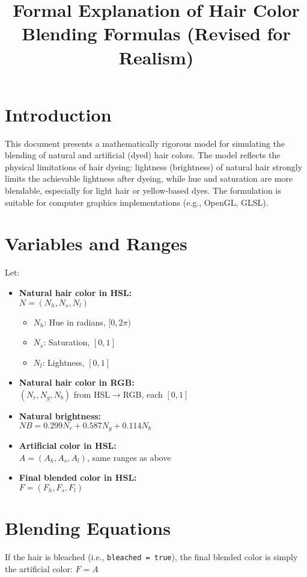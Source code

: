 \documentclass[12pt]{article}
\begin{document}
\title{Formal Explanation of Hair Color Blending Formulas (Revised for Realism)}
\author{}
\date{}
\maketitle

\section*{Introduction}
This document presents a mathematically rigorous model for simulating the blending of natural and artificial (dyed) hair colors. The model reflects the physical limitations of hair dyeing: lightness (brightness) of natural hair strongly limits the achievable lightness after dyeing, while hue and saturation are more blendable, especially for light hair or yellow-based dyes. The formulation is suitable for computer graphics implementations (e.g., OpenGL, GLSL).

\section*{Variables and Ranges}
Let:
\begin{itemize}
    \item \textbf{Natural hair color in HSL:} \\ $N = (N_h, N_s, N_l)$
    \begin{itemize}
        \item $N_h$: Hue in radians, $[0, 2\pi)$
        \item $N_s$: Saturation, $[0, 1]$
        \item $N_l$: Lightness, $[0, 1]$
    \end{itemize}
    \item \textbf{Natural hair color in RGB:} \\ $(N_r, N_g, N_b)$ from HSL$\to$RGB, each $[0, 1]$
    \item \textbf{Natural brightness:} \\ $NB = 0.299 N_r + 0.587 N_g + 0.114 N_b$
    \item \textbf{Artificial color in HSL:} \\ $A = (A_h, A_s, A_l)$, same ranges as above
    \item \textbf{Final blended color in HSL:} \\ $F = (F_h, F_s, F_l)$
\end{itemize}

\section*{Blending Equations}
If the hair is bleached (i.e., \texttt{bleached = true}), the final blended color is simply the artificial color:
\(
F = A
\)
\end{document}
